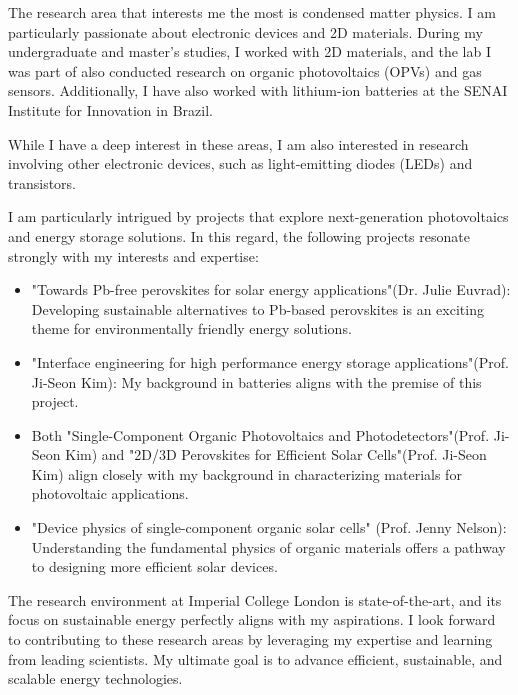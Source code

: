 \documentclass[12pt]{article}
\begin{document}
The research area that interests me the most is condensed matter physics. I am particularly passionate about electronic devices and 2D materials. During my undergraduate and master's studies, I worked with 2D materials, and the lab I was part of also conducted research on organic photovoltaics (OPVs) and gas sensors. Additionally, I have also worked with lithium-ion batteries at the SENAI Institute for Innovation in Brazil.

While I have a deep interest in these areas, I am also interested in research involving other electronic devices, such as light-emitting diodes (LEDs) and transistors.

I am particularly intrigued by projects that explore next-generation photovoltaics and energy storage solutions. In this regard, the following projects resonate strongly with my interests and expertise:
\begin{itemize}
    \item "Towards Pb-free perovskites for solar energy applications"(Dr. Julie Euvrad): Developing sustainable alternatives to Pb-based perovskites is an exciting theme for environmentally friendly energy solutions.
    \item "Interface engineering for high performance energy storage applications"(Prof. Ji-Seon Kim): My background in batteries aligns with the premise of this project.
    \item  Both "Single-Component Organic Photovoltaics and Photodetectors"(Prof. Ji-Seon Kim) and "2D/3D Perovskites for Efficient Solar Cells"(Prof. Ji-Seon Kim) align closely with my background in characterizing materials for photovoltaic applications.
    \item "Device physics of single-component organic solar cells" (Prof. Jenny Nelson): Understanding the fundamental physics of organic materials offers a pathway to designing more efficient solar devices.
\end{itemize}


The research environment at Imperial College London is state-of-the-art, and its focus on sustainable energy perfectly aligns with my aspirations. I look forward to contributing to these research areas by leveraging my expertise and learning from leading scientists. My ultimate goal is to advance efficient, sustainable, and scalable energy technologies.
\vspace{0.125in}


\end{document}
